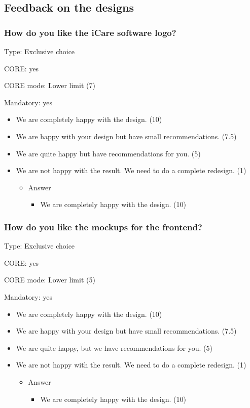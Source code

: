 \subsection{Feedback on the designs}
\label{sec:org2a4d070}
\subsubsection{How do you like the iCare software logo?}
\label{sec:orge4d1019}
Type: Exclusive choice 

CORE: yes

CORE mode: Lower limit (7) 

Mandatory: yes 

\begin{itemize}
	\item We are completely happy with the design. (10) 
	\item We are happy with your design but have small recommendations. (7.5) 
	\item We are quite happy but have recommendations for you. (5) 
	\item We are not happy with the result. We need to do a complete redesign. (1)
	
	\begin{itemize}
		\item Answer
		\begin{itemize}
			\item We are completely happy with the design. (10) 
		\end{itemize}
	\end{itemize}
\end{itemize}

\subsubsection{How do you like the mockups for the frontend?}
\label{sec:org98a956e}

Type: Exclusive choice

CORE: yes

CORE mode: Lower limit (5)

Mandatory: yes

\begin{itemize}
	\item We are completely happy with the design. (10)
	\item We are happy with your design but have small recommendations. (7.5)
	\item We are quite happy, but we have recommendations for you. (5)
	\item We are not happy with the result. We need to do a complete redesign. (1)
	
	\begin{itemize}
		\item Answer
		\begin{itemize}
			\item We are completely happy with the design. (10)
		\end{itemize}
	\end{itemize}
\end{itemize}


